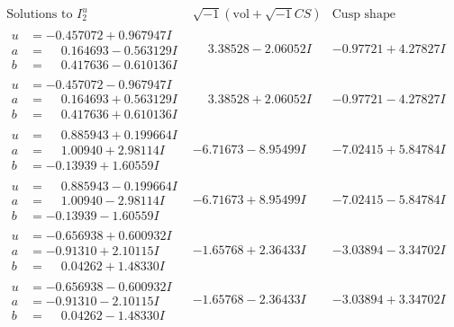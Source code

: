 \documentclass[1p]{elsarticle_modified}
\theoremstyle{definition}
\newcommand{\I}{\sqrt{-1}}
\begin{document}
$$\begin{array}{c|c|c}  
\text{Solutions to }I^u_{2}& \I (\text{vol} + \sqrt{-1}CS) & \text{Cusp shape}\\
 \hline 
\begin{aligned}
u &= -0.457072 + 0.967947 I \\
a &= \phantom{-}0.164693 - 0.563129 I \\
b &= \phantom{-}0.417636 - 0.610136 I\end{aligned}
 & \phantom{-}3.38528 - 2.06052 I & -0.97721 + 4.27827 I \\ \hline\begin{aligned}
u &= -0.457072 - 0.967947 I \\
a &= \phantom{-}0.164693 + 0.563129 I \\
b &= \phantom{-}0.417636 + 0.610136 I\end{aligned}
 & \phantom{-}3.38528 + 2.06052 I & -0.97721 - 4.27827 I \\ \hline\begin{aligned}
u &= \phantom{-}0.885943 + 0.199664 I \\
a &= \phantom{-}1.00940 + 2.98114 I \\
b &= -0.13939 + 1.60559 I\end{aligned}
 & -6.71673 - 8.95499 I & -7.02415 + 5.84784 I \\ \hline\begin{aligned}
u &= \phantom{-}0.885943 - 0.199664 I \\
a &= \phantom{-}1.00940 - 2.98114 I \\
b &= -0.13939 - 1.60559 I\end{aligned}
 & -6.71673 + 8.95499 I & -7.02415 - 5.84784 I \\ \hline\begin{aligned}
u &= -0.656938 + 0.600932 I \\
a &= -0.91310 + 2.10115 I \\
b &= \phantom{-}0.04262 + 1.48330 I\end{aligned}
 & -1.65768 + 2.36433 I & -3.03894 - 3.34702 I \\ \hline\begin{aligned}
u &= -0.656938 - 0.600932 I \\
a &= -0.91310 - 2.10115 I \\
b &= \phantom{-}0.04262 - 1.48330 I\end{aligned}
 & -1.65768 - 2.36433 I & -3.03894 + 3.34702 I \\ \hline\begin{aligned}

\end{aligned}
\end{array}$$
\end{document}

